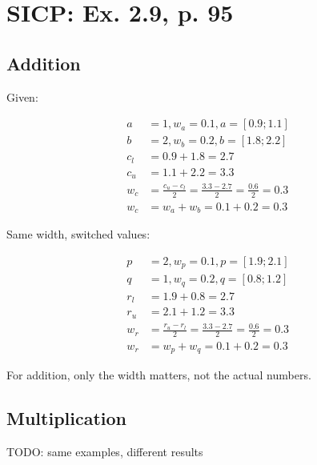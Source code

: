 \documentclass[a4paper]{scrartcl}
\begin{document}
\setlength\parindent{0pt}

\section*{SICP: Ex. 2.9, p. 95}

\subsection*{Addition}

Given:

\begin{align}
a &= 1, w_a = 0.1, a = [0.9;1.1] \\
b &= 2, w_b = 0.2, b = [1.8;2.2] \\
c_l &= 0.9 + 1.8 = 2.7 \\
c_u &= 1.1 + 2.2 = 3.3 \\
w_c &= \frac{c_u - c_l}{2} = \frac{3.3 - 2.7}{2} = \frac{0.6}{2} = 0.3 \\
w_c &= w_a + w_b = 0.1 + 0.2 = 0.3
\end{align}

Same width, switched values:

\begin{align}
p &= 2, w_p = 0.1, p = [1.9;2.1] \\
q &= 1, w_q = 0.2, q = [0.8;1.2] \\
r_l &= 1.9 + 0.8 = 2.7 \\
r_u &= 2.1 + 1.2 = 3.3 \\
w_r &= \frac{r_u - r_l}{2} = \frac{3.3 - 2.7}{2} = \frac{0.6}{2} = 0.3 \\
w_r &= w_p + w_q = 0.1 + 0.2 = 0.3
\end{align}

For addition, only the width matters, not the actual numbers.

\subsection*{Multiplication}

TODO: same examples, different results
\end{document}
